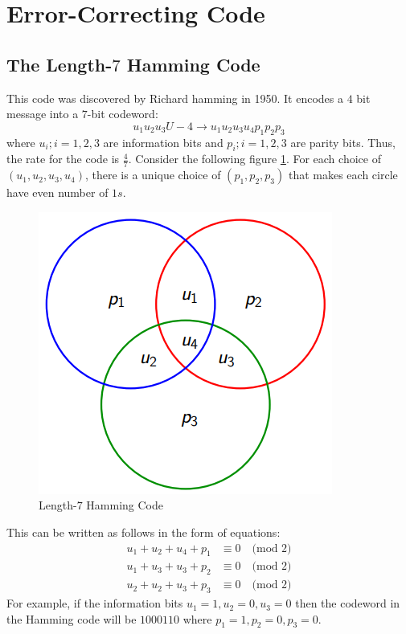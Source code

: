 \documentclass[12pt, oneside]{book}
\theoremstyle{definition}
\theoremstyle{definition}
\theoremstyle{remark}
\begin{document}
\section{Error-Correcting Code}
\subsection{The Length-$7$ Hamming Code}
This code was discovered by Richard hamming in 1950. It encodes a $4$ bit message into a $7$-bit codeword:
\[
u_1u_2u_3U-4\rightarrow u_1u_2u_3u_4p_1p_2p_3
\]
where $u_i;i=1,2,3$ are information bits and $p_i;i=1,2,3$ are parity bits. Thus, the rate for the code is $\frac{4}{7}$. Consider the following figure \ref{fig:7bithamcode}. For each choice of $(u_1,u_2,u_3,u_4)$, there is a unique choice of $(p_1,p_2,p_3)$ that makes each circle have even number of $1s$.

\begin{figure}
    \centering
    \includegraphics[width=0.5\linewidth]{../images/7bithamm.png}
    \caption{Length-$7$ Hamming Code}
    \label{fig:7bithamcode}
\end{figure}

This can be written as follows in the form of equations:
\begin{align*}
    u_1+u_2+u_4+p_1 &\equiv 0 \quad \text{(mod 2)}\\
    u_1+u_3+u_3+p_2 &\equiv 0 \quad \text{(mod 2)}\\
    u_2+u_2+u_3+p_3 &\equiv 0 \quad \text{(mod 2)}
\end{align*}
For example, if the information bits $u_1=1,u_2=0,u_3=0$ then the codeword in the Hamming code will be $1000110$ where $p_1=1,p_2=0,p_3=0$.
\end{document}
